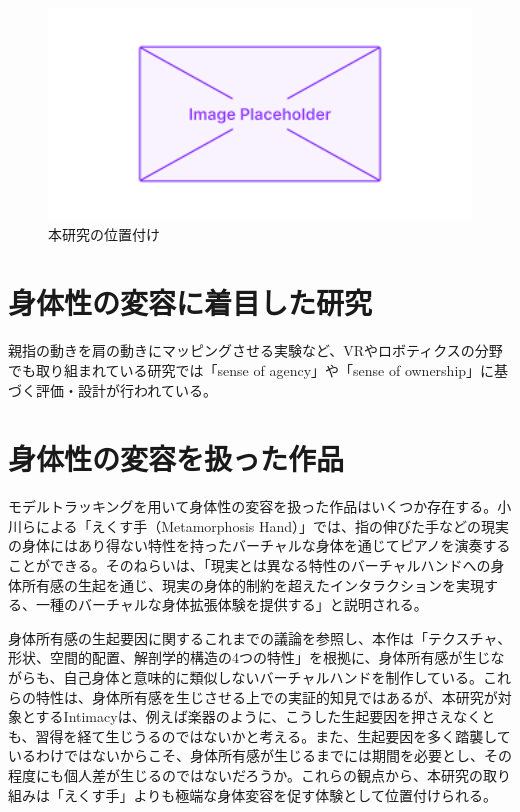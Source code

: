 \begin{figure}[H]
  \centering
  \includegraphics[width=15cm]{img/placeholder.png}
  \caption{本研究の位置付け}
  \label{fig:position}
\end{figure}

\section{身体性の変容に着目した研究}
親指の動きを肩の動きにマッピングさせる実験など、VRやロボティクスの分野でも取り組まれている研究では「sense of agency」や「sense of ownership」に基づく評価・設計が行われている。

\section{身体性の変容を扱った作品}
モデルトラッキングを用いて身体性の変容を扱った作品はいくつか存在する。小川らによる「えくす手（Metamorphosis Hand）」\cite{ekusute}では、指の伸びた手などの現実の身体にはあり得ない特性を持ったバーチャルな身体を通じてピアノを演奏することができる。そのねらいは、「現実とは異なる特性のバーチャルハンドへの身体所有感の生起を通じ、現実の身体的制約を超えたインタラクションを実現する、一種のバーチャルな身体拡張体験を提供する」と説明される。

身体所有感の生起要因に関するこれまでの議論を参照し、本作は「テクスチャ、形状、空間的配置、解剖学的構造の4つの特性」を根拠に、身体所有感が生じながらも、自己身体と意味的に類似しないバーチャルハンドを制作している。これらの特性は、身体所有感を生じさせる上での実証的知見ではあるが、本研究が対象とするIntimacyは、例えば楽器のように、こうした生起要因を押さえなくとも、習得を経て生じうるのではないかと考える。また、生起要因を多く踏襲しているわけではないからこそ、身体所有感が生じるまでには期間を必要とし、その程度にも個人差が生じるのではないだろうか。これらの観点から、本研究の取り組みは「えくす手」よりも極端な身体変容を促す体験として位置付けられる。

